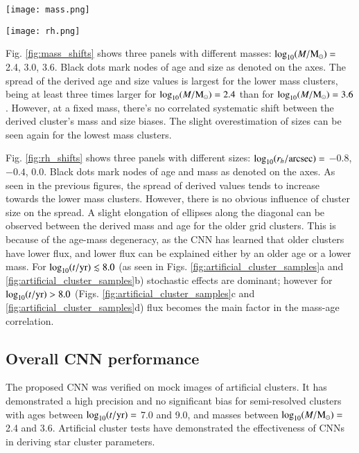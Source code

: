 \documentclass{aa}
\begin{document}
\begin{figure*}
    \centering
    \texttt{[image: mass.png]}
    \caption{Same as Fig. \ref{fig:age_shifts}, but panels show $r_h$ vs. age for three different masses.}
    \label{fig:mass_shifts}
\end{figure*}

\begin{figure*}
    \centering
    \texttt{[image: rh.png]}
    \caption{Same as Fig. \ref{fig:age_shifts}, but panels show mass vs. age for three different $r_h$ values.}
    \label{fig:rh_shifts}
\end{figure*}


Fig. \ref{fig:mass_shifts} shows three panels with different masses: $\log_{10}(M/{\rm M_\odot})=$ 2.4, 3.0, 3.6. Black dots mark nodes of age and size as denoted on the axes. The spread of the derived age and size values is largest for the lower mass clusters, being at least three times larger for $\log_{10}(M/{\rm M_\odot})=2.4$ than for $\log_{10}(M/{\rm M_\odot})=3.6$. However, at a fixed mass, there's no correlated systematic shift between the derived cluster's mass and size biases. The slight overestimation of sizes can be seen again for the lowest mass clusters.

Fig. \ref{fig:rh_shifts} shows three panels with different sizes: $\log_{10}(r_h/{\rm arcsec})=$ $-0.8$, $-0.4$, 0.0. Black dots mark nodes of age and mass as denoted on the axes. As seen in the previous figures, the spread of derived values tends to increase towards the lower mass clusters. However, there is no obvious influence of cluster size on the spread. A slight elongation of ellipses along the diagonal can be observed between the derived mass and age for the older grid clusters. This is because of the age-mass degeneracy, as the CNN has learned that older clusters have lower flux, and lower flux can be explained either by an older age or a lower mass. For $\log_{10}(t/{\rm yr})\lesssim8.0$ (as seen in Figs. \ref{fig:artificial_cluster_samples}a and \ref{fig:artificial_cluster_samples}b) stochastic effects are dominant; however for $\log_{10}(t/{\rm yr})>8.0$ (Figs. \ref{fig:artificial_cluster_samples}c and \ref{fig:artificial_cluster_samples}d) flux becomes the main factor in the mass-age correlation.

\subsection{Overall CNN performance} \label{sec:overall_performance}
The proposed CNN was verified on mock images of artificial clusters. It has demonstrated a high precision and no significant bias for semi-resolved clusters with ages between $\log_{10}(t/{\rm yr})=$ 7.0 and 9.0, and masses between $\log_{10}(M/{\rm M_\odot})=$ 2.4 and 3.6. Artificial cluster tests have demonstrated the effectiveness of CNNs in deriving star cluster parameters.
\end{document}
